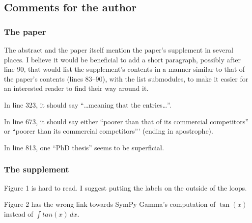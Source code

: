 \documentclass[answers,12pt]{exam}
\begin{document}
\subsection{Comments for the author}
\subsubsection{The paper}

\begin{questions}
\question The abstract and the paper itself mention the paper's supplement in several places. I believe it would be beneficial to add a short paragraph, possibly after line 90, that would list the supplement's contents in a manner similar to that of the paper's contents (lines 83--90), with the list submodules, to make it easier for an interested reader to find their way around it.

\question In line 323, it should say ``\ldots meaning that the entries\ldots''.

\question In line 673, it should say either ``poorer than that of its commercial competitors'' or ``poorer than its commercial competitors''' (ending in apostrophe).

\question In line 813, one ``PhD thesis'' seems to be superficial.

\subsubsection{The supplement}

\question Figure 1 is hard to read. I suggest putting the labels on the outside of the loops.

\question Figure 2 has the wrong link towards SymPy Gamma's computation of $\tan(x)$
 instead of $\int tan(x)\,dx$.

\end{questions}
\end{document}
